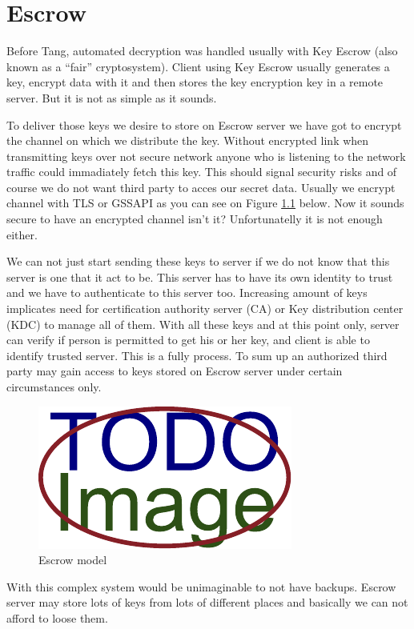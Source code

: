 \documentclass[../xdudla00-porting-Tang-to-Open-WRT.tex]{subfiles}
\begin{document}
\chapter{Escrow}\label{escrow}
Before Tang, automated decryption was handled usually with Key Escrow (also known as a “fair” cryptosystem).
Client using Key Escrow usually generates a key, encrypt data with it and then stores the key encryption key in a remote server.
But it is not as simple as it sounds.

To deliver those keys we desire to store on Escrow server we have got to encrypt the channel on which we distribute the key.
Without encrypted link when transmitting keys over not secure network anyone who is listening to the network traffic could immadiately fetch this key.
This should signal security risks and of course we do not want third party to acces our secret data.
Usually we encrypt channel with TLS or GSSAPI as you can see on Figure \ref{fig:escrowmodel} below. Now it sounds secure to have an encrypted channel isn't it? Unfortunatelly it is not enough either.

We can not just start sending these keys to server if we do not know that this server is one that it act to be.
This server has to have its own identity to trust and we have to authenticate to this server too.
Increasing amount of keys implicates need for certification authority server (CA) or Key distribution center (KDC) to manage all of them.
With all these keys and at this point only, server can verify if person is permitted to get his or her key, and client is able to identify trusted server.
This is a fully  process.
To sum up an authorized third party may gain access to keys stored on Escrow server under certain circumstances only.

\begin{figure}[h]
    \centering
    \includegraphics{../figures/placeholder.pdf}
    \caption{Escrow model}
    \label{fig:escrowmodel}
\end{figure}

With this complex system would be unimaginable to not have backups.
Escrow server may store lots of keys from lots of different places and basically we can not afford to loose them.
\end{document}
